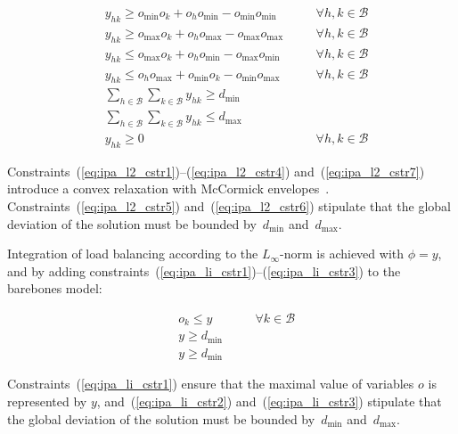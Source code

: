 \documentclass{llncs}
\begin{document}
\begin{align}
  & y_{hk} \geq o_{\min}o_{k} + o_{h}o_{\min} - o_{\min}o_{\min}                           && \quad \forall h,k \in \mathcal{B} \label{eq:ipa_l2_cstr1} \\
  & y_{hk} \geq o_{\max}o_{k} + o_{h}o_{\max} - o_{\max}o_{\max}                           && \quad \forall h,k \in \mathcal{B} \label{eq:ipa_l2_cstr2} \\
  & y_{hk} \leq o_{\max}o_{k} + o_{h}o_{\min} - o_{\max}o_{\min}                           && \quad \forall h,k \in \mathcal{B} \label{eq:ipa_l2_cstr3} \\
  & y_{hk} \leq o_{h}o_{\max} + o_{\min}o_{k} - o_{\min}o_{\max}                           && \quad \forall h,k \in \mathcal{B} \label{eq:ipa_l2_cstr4} \\
  & \sum \limits_{h \in \mathcal{B}} \sum \limits_{k \in \mathcal{B}} y_{hk} \geq d_{\min}                                      \label{eq:ipa_l2_cstr5} \\
  & \sum \limits_{h \in \mathcal{B}} \sum \limits_{k \in \mathcal{B}} y_{hk} \leq d_{\max}                                      \label{eq:ipa_l2_cstr6} \\
  & y_{hk} \geq 0                                                                          && \quad \forall h,k \in \mathcal{B} \label{eq:ipa_l2_cstr7}
\end{align}

Constraints~(\ref{eq:ipa_l2_cstr1})--(\ref{eq:ipa_l2_cstr4}) and~(\ref{eq:ipa_l2_cstr7}) introduce a convex relaxation with McCormick envelopes~\cite{Mitsos2009}. Constraints~(\ref{eq:ipa_l2_cstr5}) and~(\ref{eq:ipa_l2_cstr6}) stipulate that the global deviation of the solution must be bounded by~$d_{\min}$ and~$d_{\max}$.

Integration of load balancing according to the $L_{\infty}$-norm is achieved with $\phi = y$, and by adding constraints~(\ref{eq:ipa_li_cstr1})--(\ref{eq:ipa_li_cstr3}) to the barebones model:

\begin{align}
  & o_{k} \leq y    && \quad \forall k \in \mathcal{B} \label{eq:ipa_li_cstr1} \\
  & y \geq d_{\min}                                    \label{eq:ipa_li_cstr2} \\
  & y \geq d_{\min}                                    \label{eq:ipa_li_cstr3}
\end{align}

Constraints~(\ref{eq:ipa_li_cstr1}) ensure that the maximal value of variables $o$ is represented by $y$, and~(\ref{eq:ipa_li_cstr2}) and~(\ref{eq:ipa_li_cstr3}) stipulate that the global deviation of the solution must be bounded by~$d_{\min}$ and~$d_{\max}$.
\end{document}
